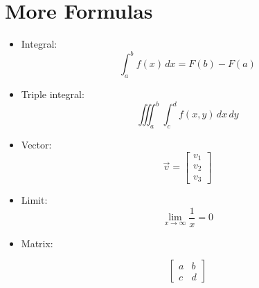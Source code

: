 \documentclass{article}
\begin{document}
\section{More Formulas}
\begin{itemize}

\item Integral:
$$\int_{a}^{b} f(x) \, dx = F(b) - F(a)$$

\item Triple integral:
$$\iiint_{a}^{b} \int_{c}^{d} f(x,y) \, dx \, dy$$

\item Vector:
$$\vec{v} = \begin{bmatrix} v_1 \\ v_2 \\ v_3 \end{bmatrix}$$

\item Limit:
$$\lim_{x \to \infty} \frac{1}{x} = 0$$

\item Matrix:

$$\begin{bmatrix}
a & b \\
c & d
\end{bmatrix}$$


\end{itemize}
\end{document}
